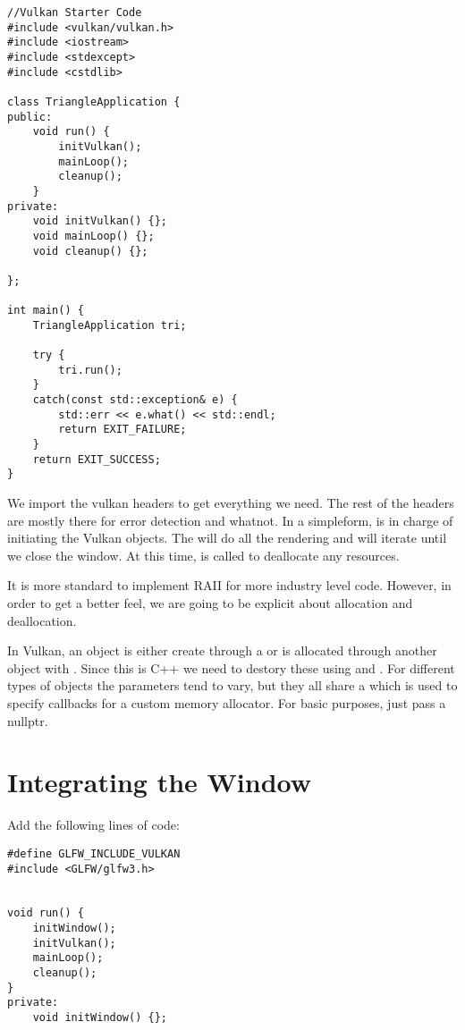 \begin{center}
\begin{minipage}{0.95\linewidth}  %
\begin{lstlisting}
//Vulkan Starter Code
#include <vulkan/vulkan.h>
#include <iostream>
#include <stdexcept>
#include <cstdlib>

class TriangleApplication {
public:
    void run() {
        initVulkan();
        mainLoop();
        cleanup();
    }
private:
    void initVulkan() {};
    void mainLoop() {};
    void cleanup() {};

};

int main() {
    TriangleApplication tri;

    try {
        tri.run();
    }
    catch(const std::exception& e) {
        std::err << e.what() << std::endl;
        return EXIT_FAILURE;
    }
    return EXIT_SUCCESS;
}
\end{lstlisting}
\end{minipage}
\end{center}

\par We import the vulkan headers to get everything we need. The rest of the headers are mostly there for error detection and whatnot. In a simpleform,  is in charge of initiating the Vulkan objects. The  will do all the rendering and will iterate until we close the window. At this time,  is called to deallocate any resources.

\par It is more standard to implement RAII for more industry level code. However, in order to get a better feel, we are going to be explicit about allocation and deallocation.

\par In Vulkan, an object is either create through a  or is allocated through another object with . Since this is C++ we need to destory these using  and . For different types of objects the parameters tend to vary, but they all share a  which is used to specify callbacks for a custom memory allocator. For basic purposes, just pass a nullptr.

\section*{Integrating the Window}
Add the following lines of code:
\begin{center}
\begin{minipage}{0.95\linewidth}
\begin{lstlisting}
#define GLFW_INCLUDE_VULKAN
#include <GLFW/glfw3.h>


void run() {
    initWindow();
    initVulkan();
    mainLoop();
    cleanup();
}
private:
    void initWindow() {};
\end{lstlisting}
\end{minipage}
\end{center}

